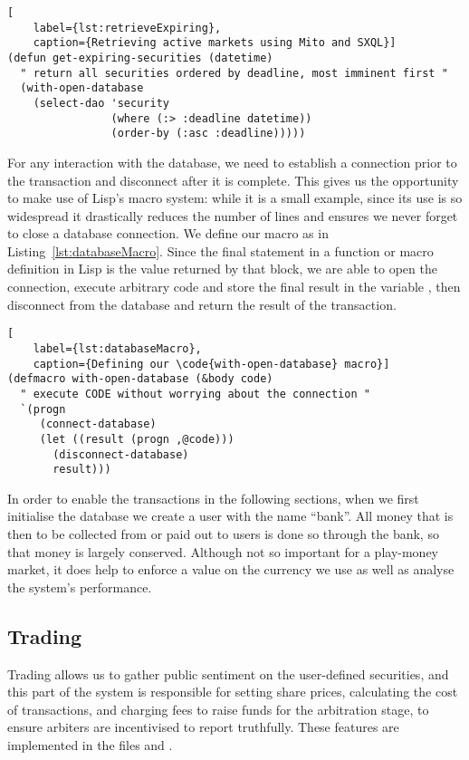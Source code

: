 \begin{lstlisting}[
	label={lst:retrieveExpiring},
	caption={Retrieving active markets using Mito and SXQL}]
(defun get-expiring-securities (datetime)
  " return all securities ordered by deadline, most imminent first "
  (with-open-database
    (select-dao 'security
                (where (:> :deadline datetime))
                (order-by (:asc :deadline)))))
\end{lstlisting}

For any interaction with the database, we need to establish a connection prior
to the transaction and disconnect after it is complete. This gives us the
opportunity to make use of Lisp's macro system: while it is a small example,
since its use is so widespread it drastically reduces the number of lines and
ensures we never forget to close a database connection. We define our macro
 as in Listing~\ref{lst:databaseMacro}. Since the
final statement in a function or macro definition in Lisp is the value returned
by that block, we are able to open the connection, execute arbitrary code and
store the final result in the variable , then disconnect from the
database and return the result of the transaction.

\begin{lstlisting}[
	label={lst:databaseMacro},
	caption={Defining our \code{with-open-database} macro}]
(defmacro with-open-database (&body code)
  " execute CODE without worrying about the connection "
  `(progn
     (connect-database)
     (let ((result (progn ,@code)))
       (disconnect-database)
       result)))
\end{lstlisting}

In order to enable the transactions in the following sections, when we first
initialise the database we create a user with the name ``bank''. All money that
is then to be collected from or paid out to users is done so through the bank,
so that money is largely conserved. Although not so important for a play-money
market, it does help to enforce a value on the currency we use as well as
analyse the system's performance.

\subsection{Trading}

Trading allows us to gather public sentiment on the user-defined securities,
and this part of the system is responsible for setting share prices,
calculating the cost of transactions, and charging fees to raise funds for the
arbitration stage, to ensure arbiters are incentivised to report truthfully.
These features are implemented in the files  and
.

